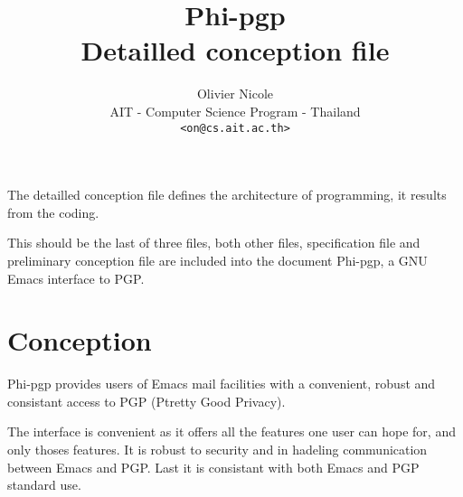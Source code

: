


\title{Phi-pgp\\Detailled conception file}
\author{Olivier {\sc Nicole}\\AIT - Computer Science Program - Thailand\\\tt <on@cs.ait.ac.th>}
\renewcommand{\today}{November 1993}
\maketitle
The detailled conception file defines the architecture of programming,
it results from the coding.

This   should  be  the  last    of three    files,  both  other files,
specification file and preliminary  conception file are included  into
the document Phi-pgp, a GNU Emacs interface to PGP.

\tableofcontents

\section{Conception}
Phi-pgp provides users of  Emacs  mail facilities with a   convenient,
robust and consistant access to PGP (Ptretty Good Privacy). 

The interface is convenient as it offers all the features one user can
hope for, and  only thoses features. It  is robust to security  and in
hadeling communication between Emacs  and PGP.  Last it is  consistant
with both Emacs and PGP standard use.



